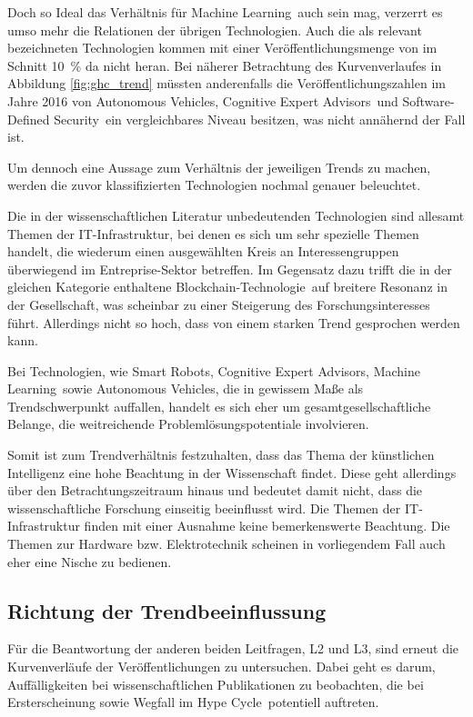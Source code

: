 Doch so Ideal das Verhältnis für \glqq Machine Learning\grqq~auch sein mag, verzerrt es umso mehr die Relationen der übrigen Technologien. Auch die als relevant bezeichneten Technologien kommen mit einer Veröffentlichungsmenge von im Schnitt 10~\% da nicht heran. Bei näherer Betrachtung des Kurvenverlaufes in Abbildung \ref{fig:ghc_trend} müssten anderenfalls die Veröffentlichungszahlen im Jahre 2016 von \glqq Autonomous Vehicles\grqq, \glqq Cognitive Expert Advisors\grqq~und \glqq Software-Defined Security\grqq~ein vergleichbares Niveau besitzen, was nicht annähernd der Fall ist.

Um dennoch eine Aussage zum Verhältnis der jeweiligen Trends zu machen, werden die zuvor klassifizierten Technologien nochmal genauer beleuchtet.

Die in der wissenschaftlichen Literatur unbedeutenden Technologien sind allesamt Themen der IT-Infrastruktur, bei denen es sich um sehr spezielle Themen handelt, die wiederum einen ausgewählten Kreis an Interessengruppen überwiegend im Entreprise-Sektor betreffen. Im Gegensatz dazu trifft die in der gleichen Kategorie enthaltene \glqq Blockchain-Technologie\grqq~auf breitere Resonanz in der Gesellschaft, was scheinbar zu einer Steigerung des Forschungsinteresses führt. Allerdings nicht so hoch, dass von einem starken Trend gesprochen werden kann.

Bei Technologien, wie \glqq Smart Robots\grqq, \glqq Cognitive Expert Advisors\grqq, \glqq Machine Learning\grqq~sowie \glqq Autonomous Vehicles\grqq, die in gewissem Maße als Trendschwerpunkt auffallen, handelt es sich eher um gesamtgesellschaftliche Belange, die weitreichende Problemlösungspotentiale involvieren.

Somit ist zum Trendverhältnis festzuhalten, dass das Thema der künstlichen Intelligenz eine hohe Beachtung in der Wissenschaft findet. Diese geht allerdings über den Betrachtungszeitraum hinaus und bedeutet damit nicht, dass die wissenschaftliche Forschung einseitig beeinflusst wird. Die Themen der IT-Infrastruktur finden mit einer Ausnahme keine bemerkenswerte Beachtung. Die Themen zur Hardware bzw. Elektrotechnik scheinen in vorliegendem Fall auch eher eine Nische zu bedienen.

\subsection{Richtung der Trendbeeinflussung}
Für die Beantwortung der anderen beiden Leitfragen, L2 und L3, sind erneut die Kurvenverläufe der Veröffentlichungen zu untersuchen. Dabei geht es darum, Auffälligkeiten bei wissenschaftlichen Publikationen zu beobachten, die bei Ersterscheinung sowie Wegfall im \glqq Hype Cycle\grqq~potentiell auftreten.

